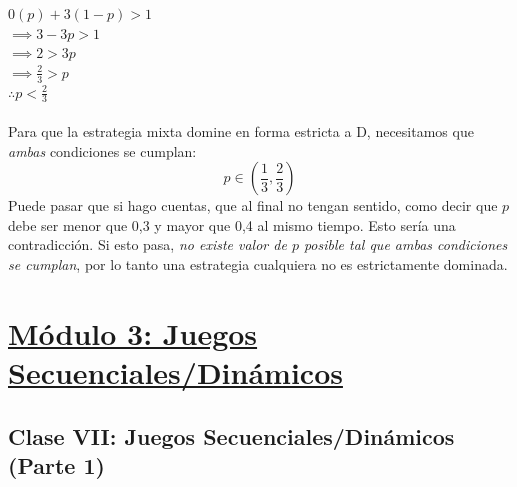 \documentclass{article}
\begin{document}
                \(0(p)+3(1-p) > 1\) \\
                \(\implies 3-3p > 1\) \\
                \(\implies 2 > 3p\) \\
                \(\implies \frac{2}{3} > p\) \\
                \(\therefore p < \frac{2}{3}\) \\
                \\
                Para que la estrategia mixta domine en forma estricta a D, necesitamos que \emph{ambas} condiciones se cumplan:
                \[p \in \left(\frac{1}{3}, \frac{2}{3}\right)\]
                Puede pasar que si hago cuentas, que al final no tengan sentido, como decir que $p$ debe ser menor que 0,3 y mayor que 0,4 al mismo tiempo. Esto sería una contradicción. Si esto pasa, \emph{no existe valor de $p$ posible tal que ambas condiciones se cumplan}, por lo tanto una estrategia cualquiera no es estrictamente dominada.
    \section*{\underline{Módulo 3: Juegos Secuenciales/Dinámicos}}
        \subsection*{Clase VII: Juegos Secuenciales/Dinámicos (Parte 1)}    
\end{document}
